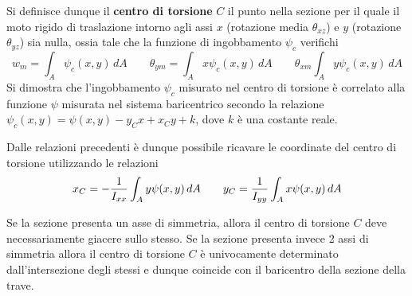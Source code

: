     	\begin{concetto}
    		Si definisce dunque il \textbf{centro di torsione} $C$ il punto nella sezione per il quale il moto rigido di traslazione intorno agli assi $x$ (rotazione media $\theta_{xz}$) e $y$ (rotazione $\theta_{yz}$) sia nulla, ossia tale che la funzione di ingobbamento $\psi_c$ verifichi
    		\[ w_m = \int_A \psi_c(x,y)\, dA \qquad \theta_{ym} = \int_A x \psi_c(x,y) \, dA \qquad \theta_{xm} \int_A y \psi_c(x,y)\, dA \]
    		Si dimostra che l'ingobbamento $\psi_c$ misurato nel centro di torsione è correlato alla funzione $\psi$ misurata nel sistema baricentrico secondo la relazione $\psi_c(x,y) = \psi(x,y) - y_Cx + x_Cy + k$, dove $k$ è una costante reale.
    	\end{concetto}
    	
    	Dalle relazioni precedenti è dunque possibile ricavare le coordinate del centro di torsione utilizzando le relazioni
    	\begin{equation}
    		x_C = - \frac 1 {I_{xx}} \int_A y \psi(x,y)\, dA \qquad y_C = \frac 1  {I_{yy}} \int_A x \psi(x,y)\, dA
    	\end{equation}
    	\begin{osservazione}
    		Se la sezione presenta un asse di simmetria, allora il centro di torsione $C$ deve necessariamente giacere sullo stesso. Se la sezione presenta invece 2 assi di simmetria allora il centro di torsione $C$ è univocamente determinato dall'intersezione degli stessi e dunque coincide con il baricentro della sezione della trave.
    	\end{osservazione}
    	
